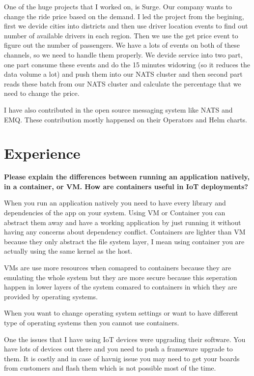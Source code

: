 One of the huge projects that I worked on, is Surge. Our company wants to change the ride price based on the demand.
I led the project from the begining, first we devide cities into districts and then use driver location events to find
out number of available drivers in each region. Then we use the get price event to figure out the number of passengers.
We have a lots of events on both of these channels, so we need to handle them properly. We devide service into two part,
one part consume these events and do the 15 minutes widowing (so it reduces the data volume a lot) and
push them into our NATS cluster and then second part reads these batch from our NATS cluster and calculate
the percentage that we need to change the price.

I have also contributed in the open source messaging system like NATS and EMQ. These contribution mostly happened
on their Operators and Helm charts.

\section{Experience}

\noindent
\textbf{Please explain the differences between running an application natively, in a container, or VM.
How are containers useful in IoT deployments?}

When you run an application natively you need to have every library and dependencies of the app on your system.
Using VM or Container you can abstract them away and have a working application by just running it without
having any concerns about dependency conflict.
Containers are lighter than VM because they only abstract the file system layer, I mean using container
you are actually using the same kernel as the host.

VMs are use more resources when comapred to containers because they are emulating the whole system but they are
more secure because this seperation happen in lower layers of the system comared to containers in which they
are provided by operating systems.

When you want to change operating system settings or want to have different type of operating systems then you cannot
use containers.

One the issues that I have using IoT devices were upgrading their software. You have lots of devices out there
and you need to push a frameware upgrade to them. It is costly and in case of havnig issue you may need to get
your boards from customers and flash them which is not possible most of the time.

